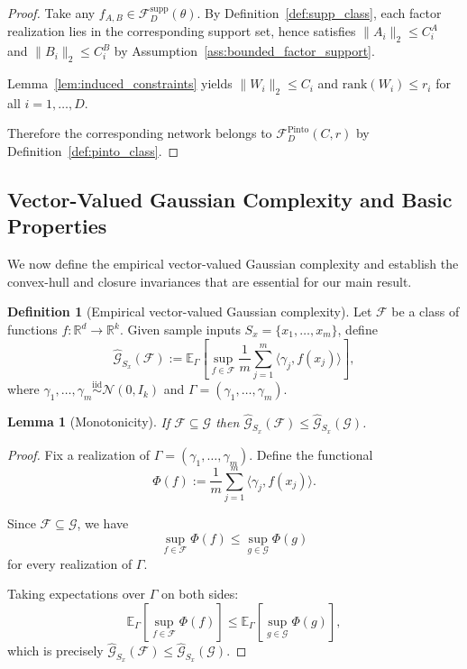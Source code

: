 \documentclass{article}
\theoremstyle{plain}
\newtheorem{lemma}[theorem]{Lemma}
\theoremstyle{definition}
\newtheorem{definition}[theorem]{Definition}
\theoremstyle{remark}
\begin{document}
\begin{proof}
Take any $f_{A,B}\in\mathcal{F}^{\mathrm{supp}}_D(\theta)$. By Definition~\ref{def:supp_class}, each factor realization lies in the corresponding support set, hence satisfies $\|A_i\|_2\le C_i^A$ and $\|B_i\|_2\le C_i^B$ by Assumption~\ref{ass:bounded_factor_support}.

Lemma~\ref{lem:induced_constraints} yields $\|W_i\|_2\le C_i$ and $\mathrm{rank}(W_i)\le r_i$ for all $i=1,\ldots,D$.

Therefore the corresponding network belongs to $\mathcal{F}^{\mathrm{Pinto}}_D(C,r)$ by Definition~\ref{def:pinto_class}.
\end{proof}

\subsection{Vector-Valued Gaussian Complexity and Basic Properties}\label{app:gaussian_complexity:vv_gc}

We now define the empirical vector-valued Gaussian complexity and establish the convex-hull and closure invariances that are essential for our main result.

\begin{definition}[Empirical vector-valued Gaussian complexity]
\label{def:vv_gaussian_complexity}
Let $\mathcal{F}$ be a class of functions $f:\mathbb{R}^d\to\mathbb{R}^k$. Given sample inputs $S_x=\{x_1,\ldots,x_m\}$, define
\[
\hat{\mathcal{G}}_{S_x}(\mathcal{F})
:=
\mathbb{E}_{\Gamma}\left[
\sup_{f\in\mathcal{F}}
\frac{1}{m}\sum_{j=1}^m \langle \gamma_j, f(x_j)\rangle
\right],
\]
where $\gamma_1,\ldots,\gamma_m\stackrel{\text{iid}}{\sim}\mathcal{N}(0,I_k)$ and $\Gamma=(\gamma_1,\ldots,\gamma_m)$.
\end{definition}

\begin{lemma}[Monotonicity]
\label{lem:monotonicity}
If $\mathcal{F}\subseteq \mathcal{G}$ then $\hat{\mathcal{G}}_{S_x}(\mathcal{F})\le \hat{\mathcal{G}}_{S_x}(\mathcal{G})$.
\end{lemma}

\begin{proof}
Fix a realization of $\Gamma=(\gamma_1,\ldots,\gamma_m)$. Define the functional
\[
\Phi(f) := \frac{1}{m}\sum_{j=1}^m \langle \gamma_j, f(x_j)\rangle.
\]

Since $\mathcal{F}\subseteq \mathcal{G}$, we have
\[
\sup_{f\in\mathcal{F}}\Phi(f) \le \sup_{g\in\mathcal{G}}\Phi(g)
\]
for every realization of $\Gamma$.

Taking expectations over $\Gamma$ on both sides:
\[
\mathbb{E}_{\Gamma}\left[\sup_{f\in\mathcal{F}}\Phi(f)\right]
\le
\mathbb{E}_{\Gamma}\left[\sup_{g\in\mathcal{G}}\Phi(g)\right],
\]
which is precisely $\hat{\mathcal{G}}_{S_x}(\mathcal{F})\le \hat{\mathcal{G}}_{S_x}(\mathcal{G})$.
\end{proof}
\end{document}
